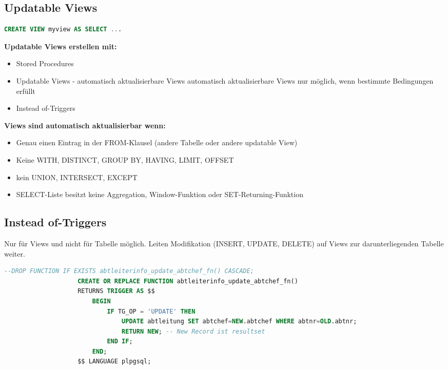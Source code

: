 \documentclass[a4paper, landscape, 8pt]{scrartcl}
\begin{document}
\begin{multicols*}{4}
        \section{Updatable Views}
        \begin{lstlisting}[language=sql]
                    CREATE VIEW myview AS SELECT ...
        \end{lstlisting}
        \textbf{Updatable Views erstellen mit:}
        \begin{itemize}
            \item Stored Procedures
            \item Updatable Views - automatisch aktualisierbare Views
            \subitem automatisch aktualisierbare Views
            \subitem nur möglich, wenn bestimmte Bedingungen erfüllt
            \item Instead of-Triggers
        \end{itemize}

        \textbf{Views sind automatisch aktualisierbar wenn:}
        \begin{itemize}
            \item Genau einen Eintrag in der FROM-Klausel (andere Tabelle oder andere updatable View)
            \item Keine WITH, DISTINCT, GROUP BY, HAVING, LIMIT, OFFSET
            \item kein UNION, INTERSECT, EXCEPT
            \item SELECT-Liste besitzt keine Aggregation, Window-Funktion oder SET-Returning-Funktion
        \end{itemize}

        \subsection{Instead of-Triggers}
        Nur für Views und nicht für Tabelle möglich.
        Leiten Modifikation (INSERT, UPDATE, DELETE) auf Views zur darunterliegenden Tabelle weiter.

        \begin{lstlisting}[language=sql]
                    --DROP FUNCTION IF EXISTS abtleiterinfo_update_abtchef_fn() CASCADE;
                    CREATE OR REPLACE FUNCTION abtleiterinfo_update_abtchef_fn()
                    RETURNS TRIGGER AS $$
                        BEGIN
                            IF TG_OP = 'UPDATE' THEN
                                UPDATE abtleitung SET abtchef=NEW.abtchef WHERE abtnr=OLD.abtnr;
                                RETURN NEW; -- New Record ist resultset
                            END IF;
                        END;
                    $$ LANGUAGE plpgsql;


\end{lstlisting}
\end{multicols*}
\end{document}
